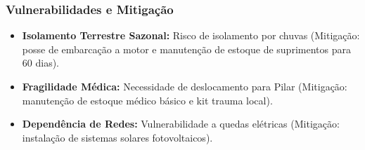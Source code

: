\subsubsection{Vulnerabilidades e
Mitigação}

\begin{itemize}
\tightlist
\item
  \textbf{Isolamento Terrestre Sazonal:} Risco de isolamento por chuvas
  (Mitigação: posse de embarcação a motor e manutenção de estoque de
  suprimentos para 60 dias).
\item
  \textbf{Fragilidade Médica:} Necessidade de deslocamento para Pilar
  (Mitigação: manutenção de estoque médico básico e kit trauma local).
\item
  \textbf{Dependência de Redes:} Vulnerabilidade a quedas elétricas
  (Mitigação: instalação de sistemas solares fotovoltaicos).
\end{itemize}

